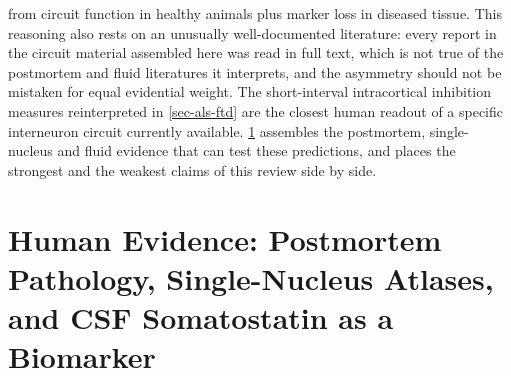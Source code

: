 \documentclass[11pt]{article}
\begin{document}
from circuit function in healthy animals plus marker loss in diseased tissue. This reasoning also rests on an unusually well-documented literature: every report in the circuit material assembled here was read in full text, which is not true of the postmortem and fluid literatures it interprets, and the asymmetry should not be mistaken for equal evidential weight. The short-interval intracortical inhibition measures reinterpreted in \ref{sec-als-ftd} are the closest human readout of a specific interneuron circuit currently available. \ref{sec-human-evidence} assembles the postmortem, single-nucleus and fluid evidence that can test these predictions, and places the strongest and the weakest claims of this review side by side.

\section{Human Evidence: Postmortem Pathology, Single-Nucleus Atlases, and CSF Somatostatin as a Biomarker}
\label{sec-human-evidence}
\end{document}
